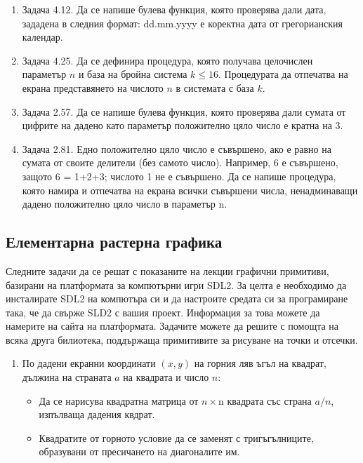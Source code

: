 \documentclass[12pt,a4paper]{article}
\begin{document}
{\begin{enumerate}[resume]
	\item Задача 4.12.\cite{sbornik} Да се напише булева функция, която проверява дали дата, зададена в следния формат: dd.mm.yyyy е коректна дата от грегорианския календар.
	\item Задача 4.25.\cite{sbornik} Да се дефинира процедура, която получава целочислен параметър $n$ и база на бройна система $k \leq 16$. Процедурата да отпечатва на екрана представянето на числото $n$ в системата с база $k$.
	\item Задача 2.57.\cite{sbornik}	Да се напише булева функция, която проверява дали сумата от цифрите на дадено като параметър положително цяло число е кратна на 3.
	\item Задача 2.81.\cite{sbornik} Едно положително цяло число е съвършено, ако е равно на сумата от своите делители (без самото число). Например, 6 е съвършено, защото 6 = 1+2+3; числото 1 не е съвършено. Да се напише процедура, която намира и отпечатва на екрана  всички съвършени числа, ненадминаващи дадено положително цяло число в параметър n.

\end{enumerate}

\subsection {Елементарна растерна графика}

	Следните задачи да се решат с показаните на лекции графични примитиви, базирани на платформата за компютърни игри SDL2. За целта е необходимо да инсталирате SDL2 на компютъра си и да настроите средата си за програмиране така, че да свърже SLD2 с вашия проект. Информация за това можете да намерите на сайта на платформата.
	Задачите можете да решите с помощта на всяка друга билиотека, поддържаща примитивите за рисуване на точки и отсечки.


\begin{enumerate}[resume]


	\item По дадени екранни координати $(x,y)$ на горния ляв ъгъл на квадрат, дължина на страната $a$ на квадрата и число $n$:

	\begin{itemize}
		\item Да се нарисува квадратна матрица от $n \times $n квадрата със страна $a/n$, изпълваща дадения квдрат.
		\item Квадратите от горното условие да се заменят с тригъгълниците, образувани от пресичането на диагоналите им.
	\end{itemize}


\end{enumerate}}
\end{document}
